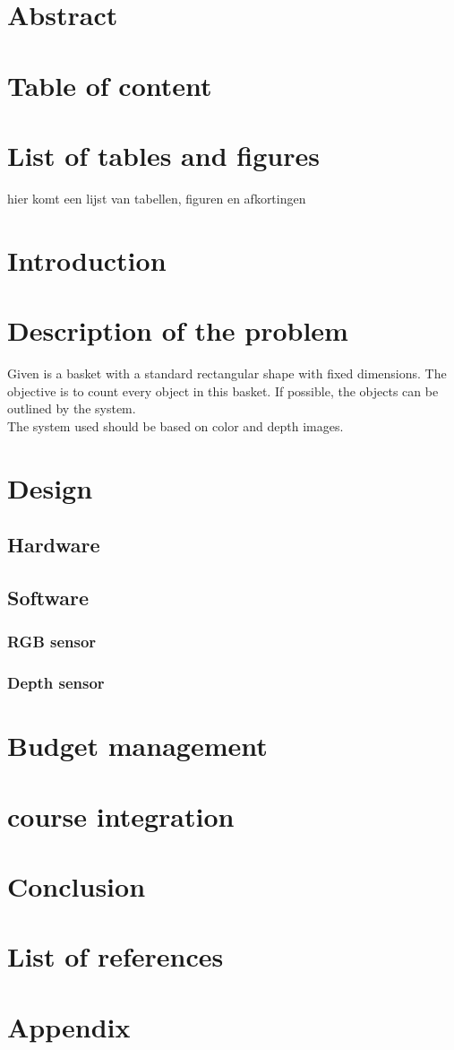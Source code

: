 \documentclass{article}
\begin{document}
\section{Abstract}

\section{Table of content}

\section{List of tables and figures}
hier komt een lijst van tabellen, figuren en afkortingen

\section{Introduction}

\section{Description of the problem}

\hspace{\parindent} Given is a basket with a standard rectangular shape with fixed dimensions. The objective is to count every object in this basket. If possible, the objects can be outlined by the system.\\

\noindent The system used should be based on color and depth images.


\section{Design}
\subsection{Hardware}
\subsection{Software}
\subsubsection{RGB sensor}
\subsubsection{Depth sensor}

\section{Budget management}

\section{course integration}

\section{Conclusion}

\section{List of references}

\section{Appendix}
\end{document}

